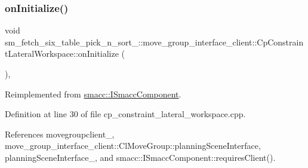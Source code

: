 \subsubsection{\texorpdfstring{on\+Initialize()}{onInitialize()}}
{\footnotesize\ttfamily void sm\+\_\+fetch\+\_\+six\+\_\+table\+\_\+pick\+\_\+n\+\_\+sort\+\_\+::move\+\_\+group\+\_\+interface\+\_\+client\+::\+Cp\+Constraint\+Lateral\+Workspace\+::on\+Initialize (\begin{DoxyParamCaption}{ }\end{DoxyParamCaption})\hspace{0.3cm}{\ttfamily [override]}, {\ttfamily [virtual]}}



Reimplemented from \hyperlink{classsmacc_1_1ISmaccComponent_ae6f71d008db12553912e9436184b9e65}{smacc\+::\+I\+Smacc\+Component}.



Definition at line 30 of file cp\+\_\+constraint\+\_\+lateral\+\_\+workspace.\+cpp.



References movegroupclient\+\_\+, move\+\_\+group\+\_\+interface\+\_\+client\+::\+Cl\+Move\+Group\+::planning\+Scene\+Interface, planning\+Scene\+Interface\+\_\+, and smacc\+::\+I\+Smacc\+Component\+::requires\+Client().



